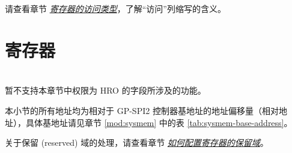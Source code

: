 \documentclass[main\_\_CN.tex]{subfiles}
\begin{document}
请查看章节 \hyperref[glossary-access-types]{\textit{寄存器的访问类型}}，了解“访问”列缩写的含义。




\section{寄存器}
\begin{importantlisting}\\
\chipname{} 暂不支持本章节中权限为 HRO 的字段所涉及的功能。
\end{importantlisting}
本小节的所有地址均为相对于 GP-SPI2 控制器基地址的地址偏移量（相对地址），具体基地址请见章节 \ref{mod:sysmem} \textit{} 中的表 \ref{tab:sysmem-base-address}。

关于保留 (reserved) 域的处理，请查看章节 \hyperref[programming-reserved-field]{\textit{如何配置寄存器的保留域}}。


\end{document}
